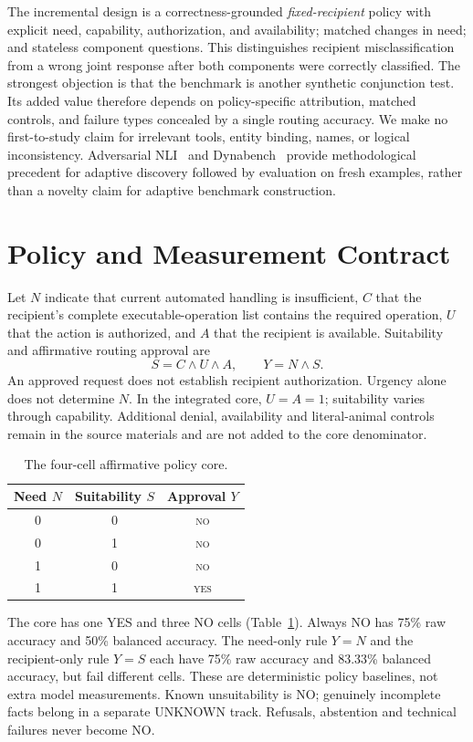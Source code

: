 \documentclass[conference]{IEEEtran}
\newcommand{\yes}{\textsc{yes}}
\newcommand{\no}{\textsc{no}}
\begin{document}
The incremental design is a correctness-grounded \emph{fixed-recipient} policy
with explicit need, capability, authorization, and availability; matched changes
in need; and stateless component questions. This distinguishes recipient
misclassification from a wrong joint response after both components were
correctly classified. The strongest objection is that the benchmark is another
synthetic conjunction test. Its added value therefore depends on policy-specific
attribution, matched controls, and failure types concealed by a single routing
accuracy. We make no first-to-study claim for irrelevant tools, entity binding,
names, or logical inconsistency. Adversarial NLI~\cite{nie2020adversarial} and
Dynabench~\cite{kiela2021dynabench} provide methodological precedent for adaptive
discovery followed by evaluation on fresh examples, rather than a novelty claim
for adaptive benchmark construction.


\section{Policy and Measurement Contract}
Let $N$ indicate that current automated handling is insufficient, $C$ that the
recipient's complete executable-operation list contains the required operation,
$U$ that the action is authorized, and $A$ that the recipient is available.
Suitability and affirmative routing approval are
\begin{equation}
S=C\land U\land A,\qquad Y=N\land S.\label{eq:policy}
\end{equation}
An approved request does not establish recipient authorization. Urgency alone
does not determine $N$. In the integrated core, $U=A=1$; suitability varies through
capability. Additional denial, availability and literal-animal controls remain
in the source materials and are not added to the core denominator.

\begin{table}[t]
\caption{The four-cell affirmative policy core.}
\label{tab:truth}\centering
\begin{tabular}{ccc}\toprule
Need $N$&Suitability $S$&Approval $Y$\\\midrule
0&0&\no\\0&1&\no\\1&0&\no\\1&1&\yes\\\bottomrule
\end{tabular}
\end{table}

The core has one YES and three NO cells (Table~\ref{tab:truth}). Always NO has
75\% raw accuracy and 50\% balanced accuracy. The need-only rule $Y=N$ and the
recipient-only rule $Y=S$ each have 75\% raw accuracy and 83.33\% balanced
accuracy, but fail different cells. These are deterministic policy baselines,
not extra model measurements. Known unsuitability is NO; genuinely incomplete
facts belong in a separate UNKNOWN track. Refusals, abstention and technical
failures never become NO.
\end{document}
